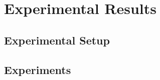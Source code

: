 \section{Experimental Results}
\label{chap:expresults}

\subsection{Experimental Setup}

\subsection{Experiments}

